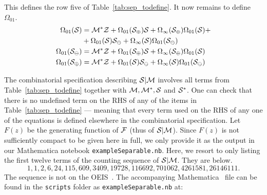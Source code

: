 \documentclass[12pt, a4paper, twoside]{report}
\begin{document}
This defines the row five of Table~\ref{tab:sep_todefine}. It now remains to define $\Omega_{01}$. 
\begin{align}
  \begin{aligned}
    \Omega_{01}(\S) %
    &= \Mstar\Z + \Omega_{01}(\S_\oplus)\S + \Omega_\infty(\S_\oplus)\Omega_{01}(\S) +\\
    &+\Omega_{01}(\S)\S_\ominus + \Omega_\infty(\S)\Omega_{01}(\S_\ominus)\\
    \Omega_{01}(\S_\ominus) %
    &= \Mstar\Z + \Omega_{01}(\S_\oplus)\S + \Omega_\infty(\S_\oplus)\Omega_{01}(\S)\\
    \Omega_{01}(\S_\oplus) %
    &= \Mstar\Z + \Omega_{01}(\S)\S_\ominus + \Omega_\infty(\S)\Omega_{01}(\S_\ominus)
  \end{aligned}
\end{align}

The combinatorial specification describing $\mathcal{S}|\mathcal{M}$ involves all terms from Table~\ref{tab:sep_todefine} together with $\mathcal{M}, \mathcal{M}^*, \mathcal{S}$ and $\mathcal{S}^*$. One can check that there is no undefined term on the RHS of any of the items in Table~\ref{tab:sep_todefine} --- meaning that every term used on the RHS of any one of the equations is defined elsewhere in the combinatorial specification. Let $F(z)$ be the generating function of $\mathcal{F}$ (thus of $\mathcal{S}|\mathcal{M}$). Since $F(z)$ is not sufficiently compact to be given here in full, we only provide it as the output in our Mathematica notebook \texttt{exampleSeparable.nb}. Here, we resort to only listing the first twelve terms of the counting sequence of $\mathcal{S}|\mathcal{M}$. They are below.
$$1,1,2,6,24,115,609,3409, 19728, 116692, 701062, 4261581, 26146111.$$
The sequence is not on the OEIS~\cite{oeis}. The accompanying Mathematica~\cite{mathematica} file can be found in the \texttt{scripts} folder as \texttt{exampleSeparable.nb} at:
\end{document}
